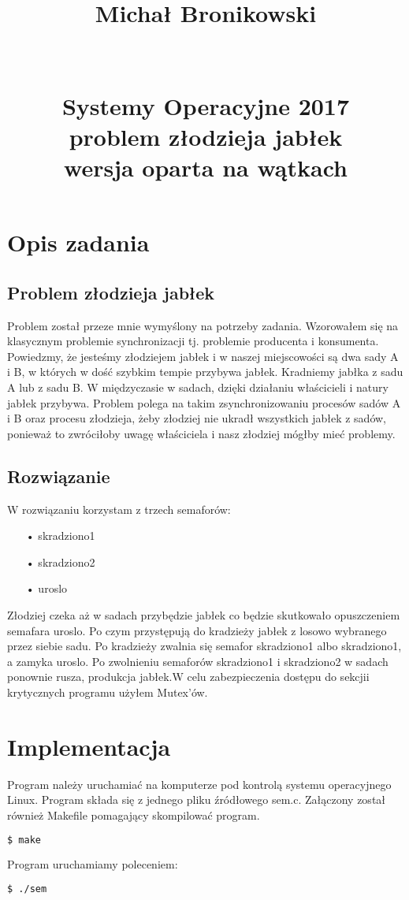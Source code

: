 \documentclass[10pt,a4paper]{article}
\title{Michał Bronikowski\protect\\ \hfill \protect\\ \protect\\ Systemy Operacyjne 2017 \protect\\ problem złodzieja jabłek \protect\\  {\small{wersja oparta na wątkach} }} %
\begin{document}
\maketitle  %
\thispagestyle{empty}
\vfill
\newpage
\tableofcontents
\newpage
\normalfont
\large
\section{Opis zadania}
\subsection{Problem złodzieja jabłek}
Problem został przeze mnie wymyślony na potrzeby zadania. Wzorowałem się na klasycznym problemie synchronizacji tj. problemie producenta i konsumenta.
Powiedzmy, że jesteśmy złodziejem jabłek i w naszej miejscowości są dwa sady A i B, w których w dość szybkim tempie przybywa jabłek. Kradniemy jabłka z
sadu A lub z sadu B. W międzyczasie w sadach, dzięki działaniu właścicieli i natury jabłek przybywa. Problem polega na takim zsynchronizowaniu procesów
sadów A i B oraz procesu złodzieja, żeby złodziej nie ukradł wszystkich jabłek z sadów, ponieważ to zwróciłoby uwagę właściciela i nasz złodziej mógłby mieć
problemy.
\subsection{Rozwiązanie}
W rozwiązaniu korzystam z trzech semaforów:
\begin{itemize}
\item[•] skradziono1
\item[•] skradziono2
\item[•] uroslo
\end{itemize}
Złodziej czeka aż w sadach przybędzie jabłek co będzie skutkowało opuszczeniem semafara \textcolor{Fuksjowy}{uroslo}. Po czym przystępują do kradzieży jabłek z losowo wybranego przez siebie sadu. Po kradzieży zwalnia się semafor \textcolor{Fuksjowy}{skradziono1} albo \textcolor{Fuksjowy}{skradziono1}, a zamyka \textcolor{Fuksjowy}{uroslo}. Po zwolnieniu semaforów \textcolor{Fuksjowy}{skradziono1} i \textcolor{Fuksjowy}{skradziono2} w sadach ponownie rusza, produkcja jabłek.W celu zabezpieczenia dostępu do sekcjii krytycznych programu użyłem Mutex'ów.
\section{Implementacja}
Program należy uruchamiać na komputerze pod kontrolą systemu operacyjnego Linux. Program składa się z jednego pliku źródłowego sem.c. Załączony został również Makefile pomagający skompilować program.
\begin{lstlisting}[language=bash,caption=Skompilowanie programu poleceniem make]
  $ make
\end{lstlisting}
Program uruchamiamy poleceniem:
\begin{lstlisting}[language=bash,caption=Uruchomienie programu]
  $ ./sem
\end{lstlisting}
\end{document}
